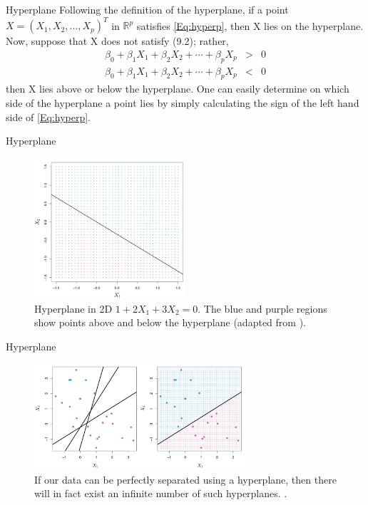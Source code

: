 \documentclass{beamer}
\begin{document}
\begin{frame}{Hyperplane}
  Following the definition of the hyperplane, if a point $X = (X_1,X_2,\ldots,X_p)^T$ in $\mathbb{R}^p$ satisfies \ref{Eq:hyperp}, then X lies on the hyperplane.  Now, suppose that X does not satisfy (9.2); rather,
  \begin{eqnarray*}
    \beta_0+\beta_1 X_1+\beta_2 X_2 + \cdots + \beta_p X_p&>&0\\ 
    \beta_0+\beta_1 X_1+\beta_2 X_2 + \cdots + \beta_p X_p&<&0 
  \end{eqnarray*}
  then X lies above or below the hyperplane.  One can easily determine on which side of the hyperplane a point lies by simply calculating the sign of the left hand side of \ref{Eq:hyperp}. 
\end{frame}
  
  \begin{frame}{Hyperplane}
    \begin{figure}
      \includegraphics[width=0.5\textwidth]{hyperplane2D}
      \caption{Hyperplane in 2D $1 + 2X_1 + 3X_2 = 0$. The blue and purple regions show points above and below the hyperplane (adapted from \cite{sohil_introduction_2022}).}
    \end{figure}
  \end{frame}

\begin{frame}{Hyperplane}
  \begin{figure}
    \includegraphics[width=0.7\textwidth]{hyperplanes}
    \caption{If our data can be perfectly separated using a hyperplane, then there will in fact exist an infinite number of such hyperplanes. \cite{sohil_introduction_2022}.}
  \end{figure}
\end{frame}
\end{document}
